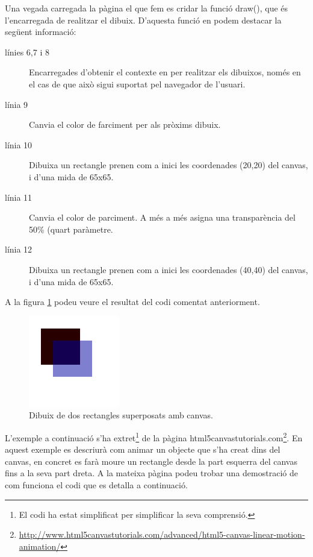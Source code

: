 Una vegada carregada la pàgina el que fem es cridar la funció draw(), que és l'encarregada de realitzar el dibuix. D'aquesta funció en podem destacar la següent informació:

\begin{description}
\item[línies 6,7 i 8]{Encarregades d'obtenir el contexte en per realitzar els dibuixos, només en el cas de que això sigui suportat pel navegador de l'usuari.}
\item[línia 9]{Canvia el color de farciment per als pròxims dibuix.}
\item[línia 10]{Dibuixa un rectangle prenen com a inici les coordenades (20,20) del canvas, i d'una mida de 65x65.}
\item[línia 11]{Canvia el color de parciment. A més a més asigna una transparència del 50\% (quart paràmetre.}
\item[línia 12]{Dibuixa un rectangle prenen com a inici les coordenades (40,40) del canvas, i d'una mida de 65x65.}
\end{description}

A la figura \ref{fig:canvas-exemple-1} podeu veure el resultat del codi comentat anteriorment. 

\begin{figure}[htbp]
\centering\includegraphics{img/canvas_example1.png}
\caption{Dibuix de dos rectangles superposats amb canvas.}
\label{fig:canvas-exemple-1}
\end{figure} 

L'exemple a continuació s'ha extret\footnote{El codi ha estat simplificat per simplificar la seva comprensió.} de la pàgina html5canvastutorials.com\footnote{\url{http://www.html5canvastutorials.com/advanced/html5-canvas-linear-motion-animation/}}. En aquest exemple es descriurà com animar un objecte que s'ha creat dins del canvas, en concret es farà moure un rectangle desde la part esquerra del canvas fins a la seva part dreta. A la mateixa pàgina podeu trobar una demostració de com funciona el codi que es detalla a continuació.  

